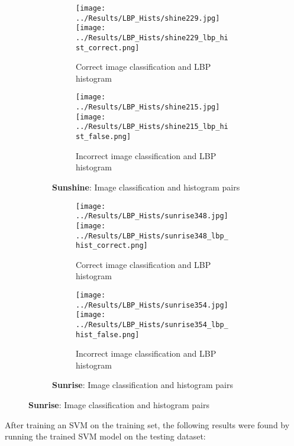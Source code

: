 \documentclass{article}
\begin{document}
\begin{figure}[H]
    \begin{subfigure}{\linewidth}
        \centering
        \begin{subfigure}{0.49\linewidth}
            \centering
            \texttt{[image: ../Results/LBP\_Hists/shine229.jpg]}
            \texttt{[image: ../Results/LBP\_Hists/shine229\_lbp\_hist\_correct.png]}
            \caption*{Correct image classification and LBP histogram}
        \end{subfigure}
        \begin{subfigure}{0.49\linewidth}
            \centering
            \texttt{[image: ../Results/LBP\_Hists/shine215.jpg]}
            \texttt{[image: ../Results/LBP\_Hists/shine215\_lbp\_hist\_false.png]}
            \caption*{Incorrect image classification and LBP histogram}
        \end{subfigure}
        \caption*{\textbf{Sunshine}: Image classification and histogram pairs}
    \end{subfigure}
    \hfill

    \begin{subfigure}{\linewidth}
        \centering
        \begin{subfigure}{0.49\linewidth}
            \centering
            \texttt{[image: ../Results/LBP\_Hists/sunrise348.jpg]}
            \texttt{[image: ../Results/LBP\_Hists/sunrise348\_lbp\_hist\_correct.png]}
            \caption*{Correct image classification and LBP histogram}
        \end{subfigure}
        \begin{subfigure}{0.49\linewidth}
            \centering
            \texttt{[image: ../Results/LBP\_Hists/sunrise354.jpg]}
            \texttt{[image: ../Results/LBP\_Hists/sunrise354\_lbp\_hist\_false.png]}
            \caption*{Incorrect image classification and LBP histogram}
        \end{subfigure}
        \caption*{\textbf{Sunrise}: Image classification and histogram pairs}
    \end{subfigure}
\end{figure}

After training an SVM on the training set, the following results were found by running the trained SVM model on the testing dataset:
\end{document}
